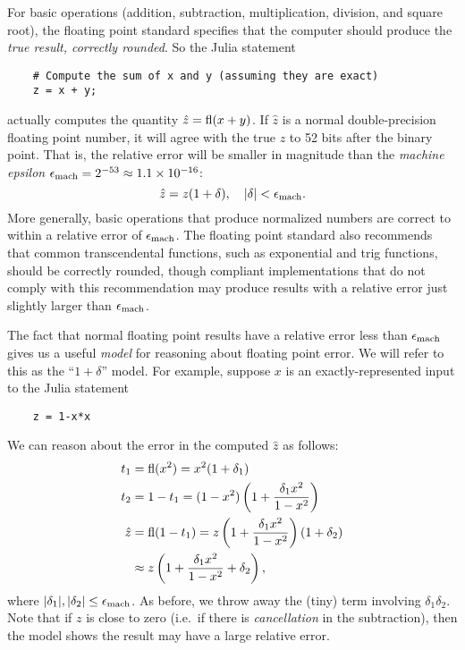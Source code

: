 \documentclass[12pt, leqno]{article}
\begin{document}
For basic operations (addition, subtraction, multiplication,
division, and square root), the floating point standard specifies that
the computer should produce the {\em true result, correctly rounded}.
So the Julia statement
\lstset{language=julia,columns=flexible}
\begin{lstlisting}
    # Compute the sum of x and y (assuming they are exact)
    z = x + y;
\end{lstlisting}
actually computes the quantity $\hat{z} = \operatorname{fl}(x+y)$.  If $\hat{z}$ is
a normal double-precision floating point number, it will agree with
the true $z$ to 52 bits after the binary point.  That is, the relative
error will be smaller in magnitude than the {\em machine epsilon}
$\epsilon_{\mathrm{mach}} = 2^{-53} \approx 1.1 \times 10^{-16}$:
\[
  \hat{z} = z(1+\delta), \quad |\delta| < \epsilon_{\mathrm{mach}}.
\]
More generally, basic operations that produce normalized numbers are
correct to within a relative error of $\epsilon_{\mathrm{mach}}$.  The floating
point standard also recommends that common transcendental functions,
such as exponential and trig functions, should be correctly rounded,
though compliant implementations that do not comply with this
recommendation may produce results with a relative error
just slightly larger than $\epsilon_{\mathrm{mach}}$.

The fact that normal floating point results have a relative error
less than $\epsilon_{\mathrm{mach}}$ gives us a useful {\em model} for reasoning about
floating point error.  We will refer to this as the ``$1 + \delta$''
model.  For example, suppose $x$ is an exactly-represented input to
the Julia statement
\begin{lstlisting}
    z = 1-x*x
\end{lstlisting}
We can reason about the error in the computed $\hat{z}$ as follows:
\begin{align*}
  t_1 &= \operatorname{fl}(x^2) = x^2 (1+\delta_1) \\
  t_2 &= 1-t_1 = (1-x^2)\left( 1 + \frac{\delta_1 x^2}{1-x^2} \right) \\
  \hat{z}
  &= \operatorname{fl}(1-t_1)
    = z \left( 1 + \frac{\delta_1 x^2}{1-x^2} \right)(1+\delta_2) \\
  & \approx z \left( 1 + \frac{\delta_1 x^2}{1-x^2} +\delta_2 \right),
\end{align*}
where $|\delta_1|, |\delta_2| \leq \epsilon_{\mathrm{mach}}$.  As before, we throw
away the (tiny) term involving $\delta_1 \delta_2$.
Note that if $z$ is close to zero (i.e.~if there is {\em cancellation} in the
subtraction), then the model shows the result may have a
large relative error.
\end{document}

